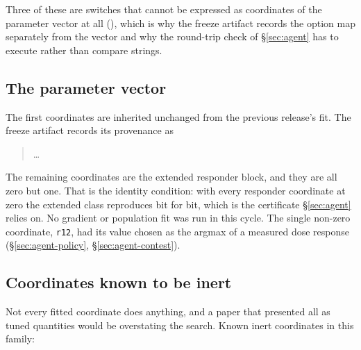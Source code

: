 \begin{center}\tabfont

\end{center}

\noindent
Three of these are switches that cannot be expressed as coordinates of the parameter vector at all
(\vsevenNotVectorisable{}), which is why the freeze artifact records the option map separately
from the vector and why the round-trip check of \S\ref{sec:agent} has to execute rather than
compare strings.

\subsection*{The parameter vector}

\begin{center}\tabfont

\end{center}

\noindent
\vsevenLayoutNote{}

The first \vsevenVsixCoords{} coordinates are inherited unchanged from the previous release's fit.
The freeze artifact records its provenance as

\begin{quote}\ttfamily\footnotesize\raggedright
\vsevenInheritedVector{}\ldots
\end{quote}

\noindent
The remaining coordinates are the extended responder block, and they are all zero but one. That is
the identity condition: with every responder coordinate at zero the extended class reproduces
\vsix{} bit for bit, which is the certificate \S\ref{sec:agent} relies on. No gradient or population
fit was run in this cycle. The single non-zero coordinate, \texttt{r12}, had its value chosen as the
argmax of a measured dose response (\S\ref{sec:agent-policy}, \S\ref{sec:agent-contest}).

\subsection*{Coordinates known to be inert}

Not every fitted coordinate does anything, and a paper that presented all
\vsevenCoordinates{} as tuned quantities would be overstating the search. Known inert coordinates in
this family:

